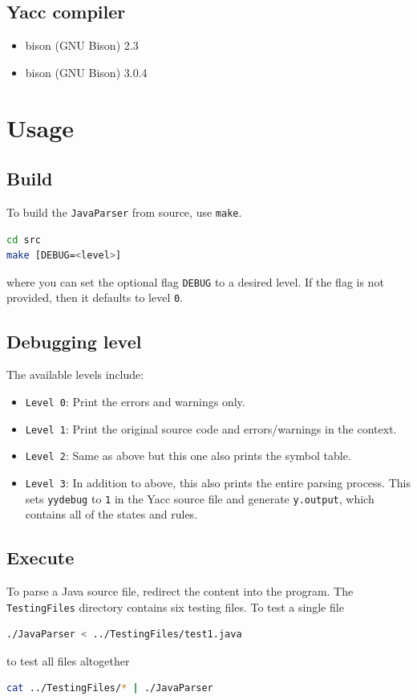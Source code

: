 \documentclass[12pt]{article}
\begin{document}
\subsection{Yacc compiler}
\begin{itemize}
    \item bison (GNU Bison) 2.3
    \item bison (GNU Bison) 3.0.4
\end{itemize}

\section{Usage}
\subsection{Build}
To build the \texttt{JavaParser} from source, use \texttt{make}.

\begin{lstlisting}[language=sh]
cd src
make [DEBUG=<level>]
\end{lstlisting}

where you can set the optional flag \texttt{DEBUG} to a desired level. If the flag is not provided, then it defaults to level \texttt{0}.
\subsection{Debugging level}
The available levels include:

\begin{itemize}
    \item \texttt{Level 0}: Print the errors and warnings only.
    \item \texttt{Level 1}: Print the original source code and errors/warnings in the context.
    \item \texttt{Level 2}: Same as above but this one also prints the symbol table.
    \item \texttt{Level 3}: In addition to above, this also prints the entire parsing process. This sets \texttt{yydebug} to \texttt{1} in the Yacc source file and generate \texttt{y.output}, which contains all of the states and rules.
\end{itemize}

\subsection{Execute}
To parse a Java source file, redirect the content into the program. The \texttt{TestingFiles} directory contains six testing files. To test a single file
\begin{lstlisting}[language=sh]
./JavaParser < ../TestingFiles/test1.java
\end{lstlisting}
to test all files altogether
\begin{lstlisting}[language=sh]
cat ../TestingFiles/* | ./JavaParser
\end{lstlisting}
\end{document}
